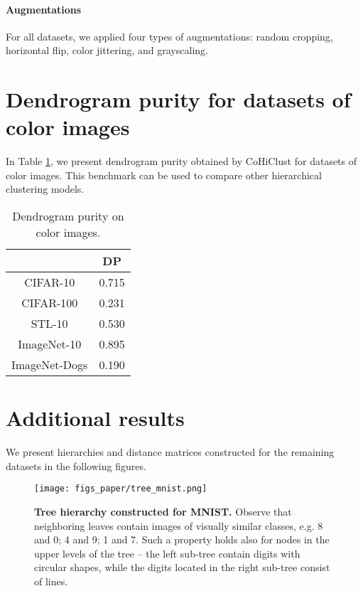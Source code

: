 \documentclass[runningheads]{llncs}
\def\our{CoHiClust}
\begin{document}
\paragraph{Augmentations}

For all datasets, we applied four types of augmentations: random cropping, horizontal flip, color jittering, and grayscaling.

\section{Dendrogram purity for datasets of color images}

In Table \ref{tab:den}, we present dendrogram purity obtained by \our{} for datasets of color images. This benchmark can be used to compare other hierarchical clustering models.

\begin{table}[!ht]
\centering
\caption{Dendrogram purity on color images.} \label{tab:den}
\begin{tabular}{cc}
\hline
 & DP  \\
\hline
CIFAR-10 & 0.715\\
CIFAR-100 & 0.231 \\
STL-10 & 0.530 \\
ImageNet-10 & 0.895  \\
ImageNet-Dogs & 0.190 \\
\hline
\end{tabular}

\end{table}

\section{Additional results}

We present hierarchies and distance matrices constructed for the remaining datasets in the following figures.

\begin{figure}[!ht]
    \centering
    \texttt{[image: figs\_paper/tree\_mnist.png]}
    \caption{ {\bf Tree hierarchy constructed for MNIST.} Observe that neighboring leaves contain images of visually similar classes, e.g. 8 and 0; 4 and 9; 1 and 7. Such a property holds also for nodes in the upper levels of the tree -- the left sub-tree contain digits with circular shapes, while the digits located in the right sub-tree consist of lines.}
    \label{fig:mnist}
\end{figure}
\end{document}
